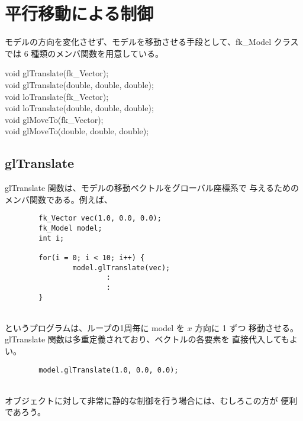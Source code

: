 \section{平行移動による制御}
モデルの方向を変化させず、モデルを移動させる手段として、fk\_Model クラス
では 6 種類のメンバ関数を用意している。
\begin{description}
\item[void glTranslate(fk\_Vector);]
\item[void glTranslate(double, double, double);]
\item[void loTranslate(fk\_Vector);]
\item[void loTranslate(double, double, double);]
\item[void glMoveTo(fk\_Vector);]
\item[void glMoveTo(double, double, double);]
\end{description}
\subsection{glTranslate}
glTranslate 関数は、モデルの移動ベクトルをグローバル座標系で
与えるためのメンバ関数である。例えば、
\\
\begin{breakbox}
\begin{verbatim}
        fk_Vector vec(1.0, 0.0, 0.0);
        fk_Model model;
        int i;

        for(i = 0; i < 10; i++) {
                model.glTranslate(vec);
                        :
                        :
        }
\end{verbatim}
\end{breakbox}
~ \\
というプログラムは、ループの1周毎に model を \(x\) 方向に 1 ずつ
移動させる。glTranslate 関数は多重定義されており、ベクトルの各要素を
直接代入してもよい。
\\
\begin{screen}
\begin{verbatim}
        model.glTranslate(1.0, 0.0, 0.0);
\end{verbatim}
\end{screen}
~ \\
オブジェクトに対して非常に静的な制御を行う場合には、むしろこの方が
便利であろう。
